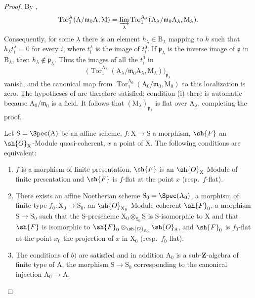 \begin{proof}
By ,
\[
  \operatorname{Tor}_1^\mathrm A
  (\mathrm A/\mathfrak m_0\mathrm A,\mathrm M)
  =\varinjlim_\lambda
  \operatorname{Tor}_1^{\mathrm A_\lambda}
  (\mathrm A_\lambda/\mathfrak m_0\mathrm A_\lambda,
   \mathrm M_\lambda).
\]
Consequently, for some $\lambda$ there is an element
$h_\lambda\in\mathrm B_\lambda$ mapping to $h$ such that
$h_\lambda t_i^\lambda=0$ for every $i$, where $t_i^\lambda$ is the
image of $t_i^0$. If $\mathfrak p_\lambda$ is the inverse image of
$\mathfrak p$ in $\mathrm B_\lambda$, then
$h_\lambda\notin\mathfrak p_\lambda$. Thus the images of all the
$t_i^0$ in
\[
  \bigl(\operatorname{Tor}_1^{\mathrm A_\lambda}
  (\mathrm A_\lambda/\mathfrak m_0\mathrm A_\lambda,
   \mathrm M_\lambda)\bigr)_{\mathfrak p_\lambda}
\]
vanish, and the canonical map from
$\operatorname{Tor}_1^{\mathrm A_0}
(\mathrm A_0/\mathfrak m_0,\mathrm M_0)$ to this localization is zero.
The hypotheses of  are therefore satisfied; condition
(i) there is automatic because $\mathrm A_0/\mathfrak m_0$ is a field.
It follows that $(\mathrm M_\lambda)_{\mathfrak p_\lambda}$ is flat
over $\mathrm A_\lambda$, completing the proof.

\begin{corollary}[11.2.7]
\label{IV.11.2.7}
Let $\mathrm{S}=\Spec(\mathrm{A})$ be an affine scheme, $f:\mathrm{X}\to\mathrm{S}$ a morphism, $\sh{F}$ an $\sh{O}_\mathrm{X}$-Module quasi-coherent, $x$ a point of $\mathrm{X}$. The following conditions are equivalent:
\begin{enumerate}[label=\emph{\alph*)}]
  \item $f$ is a morphism of finite presentation, $\sh{F}$ is an $\sh{O}_\mathrm{X}$-Module of finite presentation and $\sh{F}$ is $f$-flat at the point $x$ (resp.\ $f$-flat).
  \item There exists an affine Noetherian scheme $\mathrm{S}_0=\Spec(\mathrm{A}_0)$, a morphism of finite type $f_0:\mathrm{X}_0\to\mathrm{S}_0$, an $\sh{O}_{\mathrm{X}_0}$-Module coherent $\sh{F}_0$, a morphism $\mathrm{S}\to\mathrm{S}_0$ such that the S-prescheme $\mathrm{X}_0\otimes_{\mathrm{S}_0}\mathrm{S}$ is S-isomorphic to $\mathrm{X}$ and that $\sh{F}$ is isomorphic to $\sh{F}_0\otimes_{\sh{O}_{\mathrm{S}_0}}\sh{O}_\mathrm{S}$, and $\sh{F}_0$ is $f_0$-flat at the point $x_0$ the projection of $x$ in $\mathrm{X}_0$ (resp.\ $f_0$-flat).
  \item The conditions of $b)$ are satisfied and in addition $\mathrm{A}_0$ is a sub-$\mathbf{Z}$-algebra of finite type of $\mathrm{A}$, the morphism $\mathrm{S}\to\mathrm{S}_0$ corresponding to the canonical injection $\mathrm{A}_0\to\mathrm{A}$.
\end{enumerate}
\end{corollary}


\end{proof}

